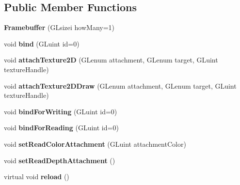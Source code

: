 \subsection*{Public Member Functions}
\begin{DoxyCompactItemize}
\item 
\hypertarget{classfillwave_1_1core_1_1Framebuffer_a3f1dae680d984445933e058f87d555a5}{}{\bfseries Framebuffer} (G\+Lsizei how\+Many=1)\label{classfillwave_1_1core_1_1Framebuffer_a3f1dae680d984445933e058f87d555a5}

\item 
\hypertarget{classfillwave_1_1core_1_1Framebuffer_a24774d51575c5cdc5b2bf782e24e9a4f}{}void {\bfseries bind} (G\+Luint id=0)\label{classfillwave_1_1core_1_1Framebuffer_a24774d51575c5cdc5b2bf782e24e9a4f}

\item 
\hypertarget{classfillwave_1_1core_1_1Framebuffer_a79034e3c1b7aee0df170fa066e89ffca}{}void {\bfseries attach\+Texture2\+D} (G\+Lenum attachment, G\+Lenum target, G\+Luint texture\+Handle)\label{classfillwave_1_1core_1_1Framebuffer_a79034e3c1b7aee0df170fa066e89ffca}

\item 
\hypertarget{classfillwave_1_1core_1_1Framebuffer_a79289cfb07a09dfaa05081591fee7660}{}void {\bfseries attach\+Texture2\+D\+Draw} (G\+Lenum attachment, G\+Lenum target, G\+Luint texture\+Handle)\label{classfillwave_1_1core_1_1Framebuffer_a79289cfb07a09dfaa05081591fee7660}

\item 
\hypertarget{classfillwave_1_1core_1_1Framebuffer_adc19f1e7ea33a50410f3ecdb997e8114}{}void {\bfseries bind\+For\+Writing} (G\+Luint id=0)\label{classfillwave_1_1core_1_1Framebuffer_adc19f1e7ea33a50410f3ecdb997e8114}

\item 
\hypertarget{classfillwave_1_1core_1_1Framebuffer_a8033714c3245d738963d5f76e2c23573}{}void {\bfseries bind\+For\+Reading} (G\+Luint id=0)\label{classfillwave_1_1core_1_1Framebuffer_a8033714c3245d738963d5f76e2c23573}

\item 
\hypertarget{classfillwave_1_1core_1_1Framebuffer_a26da0dddb7ae7fcfd2fe180243c29e87}{}void {\bfseries set\+Read\+Color\+Attachment} (G\+Luint attachment\+Color)\label{classfillwave_1_1core_1_1Framebuffer_a26da0dddb7ae7fcfd2fe180243c29e87}

\item 
\hypertarget{classfillwave_1_1core_1_1Framebuffer_ac7bcb86cec3e06263447b3fdf38c8300}{}void {\bfseries set\+Read\+Depth\+Attachment} ()\label{classfillwave_1_1core_1_1Framebuffer_ac7bcb86cec3e06263447b3fdf38c8300}

\item 
\hypertarget{classfillwave_1_1core_1_1Framebuffer_a3cb3180efee34beb841f2b1a4065d3e7}{}virtual void {\bfseries reload} ()\label{classfillwave_1_1core_1_1Framebuffer_a3cb3180efee34beb841f2b1a4065d3e7}

\end{DoxyCompactItemize}
